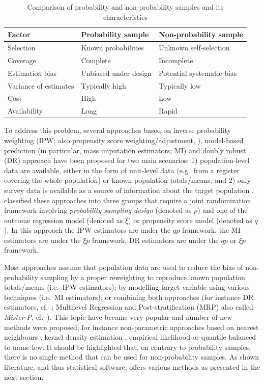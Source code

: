 \documentclass[
]{jss}
\begin{document}
\begin{table}[ht!]
    \centering
    \begin{tabular}{lll}
    \hline
    \textbf{Factor}   &  \textbf{Probability sample} & \textbf{Non-probability sample}\\
    \hline
    Selection & Known probabilities & Unknown self-selection \\
    Coverage & Complete & Incomplete \\
    Estimation bias & Unbiased under design & Potential systematic bias \\
    Variance of estimates & Typically high & Typically low \\
    Cost & High & Low \\
    Availability & Long & Rapid \\
    \hline
    \end{tabular}
    \caption{Comparison of probability and non-probability samples and its characteristics}
    \label{tab-comparison-characteristics}
\end{table}

To address this problem, several approaches based on inverse probability
weighting (IPW; also propensity score weighting/adjustment,
\citet{lee2006propensity}), model-based prediction (in particular, mass
imputation estimators; MI) and doubly robust (DR) approach have been
proposed for two main scenarios: 1) population-level data are available,
either in the form of unit-level data (e.g.~from a register covering the
whole population) or known population totals/means, and 2) only survey
data is available as a source of information about the target population
\citep[cf.][]{elliott_inference_2017}. \citet{wu2022statistical}
classified these approaches into three groups that require a joint
randomization framework involving \textit{probability sampling design}
(denoted as \(p\)) and one of the outcome regression model (denoted as
\(\xi\)) or propensity score model (denoted as \(q\)). In this approach
the IPW estimators are under the \(qp\) framework, the MI estimators are
under the \(\xi p\) framework, DR estimators are under the \(qp\) or
\(\xi p\) framework.

Most approaches assume that population data are used to reduce the bias
of non-probability sampling by a proper reweighting to reproduce known
population totals/means (i.e.~IPW estimators); by modelling target
variable using various techniques (i.e.~MI estimators); or combining
both approaches (for instance DR estimators, cf.~\citet{chen2020doubly};
Multilevel Regression and Post-stratification (MRP) also called
\textit{Mister-P}, cf.~\citet{gelman1997poststratification}). This topic
have became very popular and number of new methods were proposed; for
instance non-parametric approaches based on nearest neighbours
\citep{yang2021integration}, kernel density estimation
\citep{chen_nonparametric_2022}, empirical likelihood
\citep{kim2023empirical} or quantile balanced \citep{beresewicz2025} to
name few. It should be highlighted that, on contrary to probability
samples, there is no single method that can be used for non-probability
samples. As shown literature, and thus statistical software, offers
various methods as presented in the next section.
\end{document}
